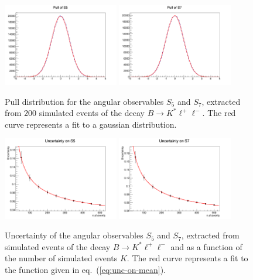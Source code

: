 \documentclass[aps,prd,reprint,nofootinbib,preprintnumbers]{revtex4}
\newcommand{\refeq}[1]{eq.~(\ref{eq:#1})}
\begin{document}
\begin{figure}[t]
        \centering
            \includegraphics[width=0.45\textwidth]{figs/pull-Q2_5_6_S5_200.png}
            \includegraphics[width=0.45\textwidth]{figs/pull-Q2_5_6_S7_200.png}
        \caption{Pull distribution for the angular observables $S_5$ and $S_7$, extracted from $200$ simulated events of the decay $B\to K^*\ell^+\ell^-$. The red curve represents a fit to a gaussian distribution.}
        \label{fig:pulls}
\end{figure}

\begin{figure}[t]
        \centering
            \includegraphics[width=0.45\textwidth]{figs/error-Q2_5_6_S5.png}
            \includegraphics[width=0.45\textwidth]{figs/error-Q2_5_6_S7.png}
            \caption{Uncertainty of the angular observables $S_5$ and $S_7$, extracted from simulated events of the decay $B\to K^*\ell^+\ell^-$ and as a function of the number of simulated events $K$. The red curve represents a fit to the function given in \refeq{unc-on-mean}.}
        \label{fig:errors}
\end{figure}
\end{document}
